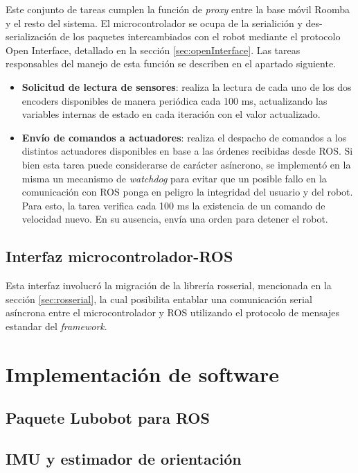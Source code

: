 Este conjunto de tareas cumplen la función de \textit{proxy} entre la base móvil Roomba y el resto del sistema. El microcontrolador se ocupa de la serialición y des-serialización de los paquetes intercambiados con el robot mediante el protocolo Open Interface, detallado en la sección \ref{sec:openInterface}. Las tareas responsables del manejo de esta función se describen en el apartado siguiente.

\begin{itemize}
  \item \textbf{Solicitud de lectura de sensores}: realiza la lectura de cada uno de los dos encoders disponibles de manera periódica cada 100 ms, actualizando las variables internas de estado en cada iteración con el valor actualizado.
  \item \textbf{Envío de comandos a actuadores}: realiza el despacho de comandos a los distintos actuadores disponibles en base a las órdenes recibidas desde ROS. Si bien esta tarea puede considerarse de carácter asíncrono, se implementó en la misma un mecanismo de \textit{watchdog} para evitar que un posible fallo en la comunicación con ROS ponga en peligro la integridad del usuario y del robot. Para esto, la tarea verifica cada 100 ms la existencia de un comando de velocidad nuevo. En su ausencia, envía una orden para detener el robot.
\end{itemize}

\subsection{Interfaz microcontrolador-ROS}

Esta interfaz involucró la migración de la librería rosserial, mencionada en la sección \ref{sec:rosserial}, la cual posibilita entablar una comunicación serial asíncrona entre el microcontrolador y ROS utilizando el protocolo de mensajes estandar del \textit{framework}.


\section{Implementación de software}

\subsection{Paquete Lubobot para ROS}

\subsection{IMU y estimador de orientación}


